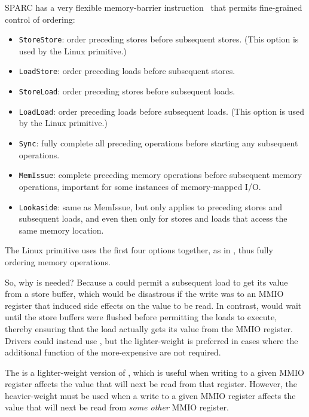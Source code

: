 SPARC has a very flexible memory-barrier instruction~\cite{SPARC94}
that permits fine-grained control of ordering:
\begin{itemize}
\item	{\tt StoreStore}: order preceding stores before subsequent stores.
	(This option is used by the Linux  primitive.)
\item	{\tt LoadStore}: order preceding loads before subsequent stores.
\item	{\tt StoreLoad}: order preceding stores before subsequent loads.
\item	{\tt LoadLoad}: order preceding loads before subsequent loads.
	(This option is used by the Linux  primitive.)
\item	{\tt Sync}: fully complete all preceding operations before starting
	any subsequent operations.
\item	{\tt MemIssue}: complete preceding memory operations before subsequent
	memory operations, important for some instances of memory-mapped
	I/O.
\item	{\tt Lookaside}: same as MemIssue, but only applies to preceding stores
	and subsequent loads, and even then only for stores and loads that
	access the same memory location.
\end{itemize}

The Linux  primitive uses the first four options together,
as in
,
thus fully ordering memory operations.

So, why is  needed?
Because a  could permit a subsequent
load to get its value from a store buffer, which would be
disastrous if the write was to an MMIO register that induced side effects
on the value to be read.
In contrast,  would wait until the store buffers
were flushed before permitting the loads to execute,
thereby ensuring that the load actually gets its value from the MMIO register.
Drivers could instead use , but the lighter-weight
 is preferred in cases where the additional function
of the more-expensive  are not required.

The  is a lighter-weight version of
, which is useful when writing to a given MMIO register
affects the value that will next be read from that register.
However, the heavier-weight  must be used when
a write to a given MMIO register affects the value that will next be
read from {\em some other} MMIO register.

